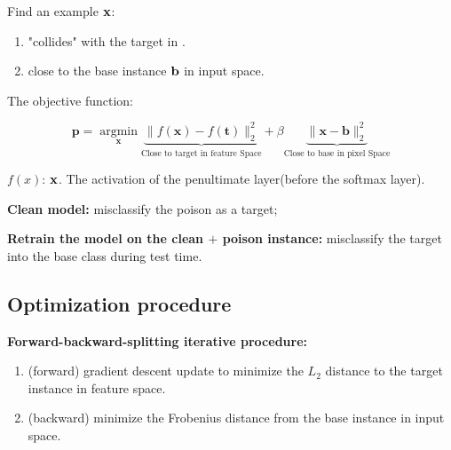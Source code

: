 \documentclass[11pt]{article}
\numberwithin{equation}{section}
\def\bb{{\bf b}}
\def\pp{{\bf p}}
\def\x{{\bf x}}
\begin{document}
Find an example $\x$: 

\begin{enumerate}
    \item "collides" with the {\color{red}target} in {\color{red}{feature space}}.
    \item close to the {\color{blue}base instance} $\bb$ in {\color{blue}input space}.
\end{enumerate}

The objective function:

\begin{equation}
    \mathbf{p}= \underset{\mathbf{x}}{\operatorname{argmin}}\underbrace{\|f(\mathbf{x})-f(\mathbf{t})\|_{2}^{2}}_{\text{Close to target in feature Space}} +\beta \underbrace{\|\mathbf{x}-\mathbf{b}\|_{2}^{2}}_{\text{Close to base in pixel Space}}
    \label{eq:poison data}
\end{equation}

$f(x)$:  $\x$. The activation of the penultimate layer(before the softmax layer).



\colorbox{NextBlue!20}{\textbf{Clean model:}}
misclassify the poison as a target;

\colorbox{orange!15}{\textbf{Retrain the model on the clean $+$ poison instance:}}
misclassify the target into the base class during test time.

\subsection{Optimization procedure}

\textbf{Forward-backward-splitting iterative procedure:}

\begin{enumerate}
    \item (forward) gradient descent update to minimize the $L_2$ distance to the target instance in feature space.
    \item (backward) minimize the Frobenius distance from the base instance in input space.
\end{enumerate}
\end{document}

